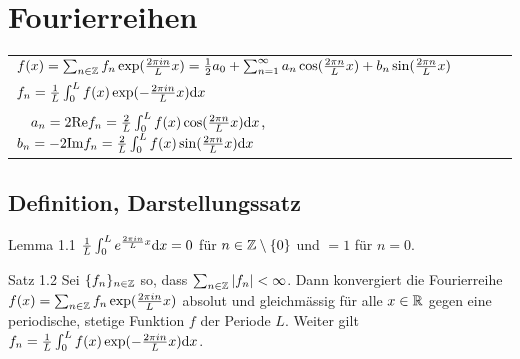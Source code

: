 \chapter{Fourierreihen}
\begin{adjustbox}{angle=0}
  \fontsize{8}{10}\selectfont
  \centering
  {\setlength{\extrarowheight}{7pt}
  \begin{tabular}{l}
     $f(x) = \sum_{n\in\mathbb{Z}} f_n \exp(\frac{2\pi i n}{L}x)=\frac12 a_0 + \sum_{n=1}^{\infty}a_n\cos(\frac{2\pi n}{L}x) + b_n\sin(\frac{2\pi n}{L}x)$ \\
     $f_n=\frac1{L} \int_0^L f(x) \exp(-\frac{2\pi in}{L}x) \mathrm{d} x$ \\
     $\quad a_n = 2 \mathrm{Re} f_n=\frac{2}{L}\int_0^L f(x)\cos(\frac{2\pi n}{L}x)\mathrm{d} x$, $b_n = -2 \mathrm{Im} f_n = \frac{2}{L}\int_0^L f(x)\sin(\frac{2\pi n}{L}x)\mathrm{d} x$ \\
  \end{tabular}}
\end{adjustbox}



\section{Definition, Darstellungssatz}

\begin{namedtheorem}{Lemma 1.1}
  $\frac1L\int_0^Le^{\frac{2\pi in}Lx}\mathrm{d} x = 0$ für $n\in\mathbb{Z}\setminus\{0\}$ und $=1$ für $n=0$.
\end{namedtheorem}

\begin{namedtheorem}{Satz 1.2}
  Sei $\{f_n\}_{n\in\mathbb{Z}}$ so, dass $\sum_{n\in\mathbb{Z}}|f_n| < \infty$. Dann konvergiert die Fourierreihe $f(x) = \sum_{n\in\mathbb{Z}} f_n \exp(\frac{2\pi i n}{L}x)$ absolut und gleichmässig für alle $x\in\mathbb{R}$ gegen eine periodische, stetige Funktion $f$ der Periode $L$. Weiter gilt $f_n=\frac1{L} \int_0^L f(x) \exp(-\frac{2\pi in}{L}x) \mathrm{d} x$.
\end{namedtheorem}

